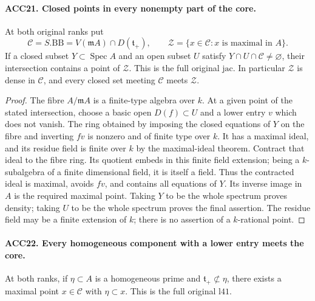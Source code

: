 \documentclass[11pt,a4paper]{article}
\numberwithin{equation}{section}
\theoremstyle{remark}\newtheorem{remark}[theorem]{Remark}
\begin{document}
\paragraph{ACC21. Closed points in every nonempty part of the core.}
\label{claim:ACC21}
At both original ranks put
\[
 \mathcal C=S.\mathrm{BB}
   =V(\mathfrak m A)\cap D(\mathfrak t_+),\qquad
 \mathcal Z=\{x\in\mathcal C:x\text{ is maximal in }A\}.
                                                               \tag{ACC.28}
\]
If a closed subset \(Y\subset\operatorname{Spec}A\) and an
open subset \(U\) satisfy \(Y\cap U\cap\mathcal C\ne\varnothing\),
their intersection contains a point of \(\mathcal Z\).
This is the full original \(\mathrm{jac}\).  In particular
\(\mathcal Z\) is dense in \(\mathcal C\), and every closed
set meeting \(\mathcal C\) meets \(\mathcal Z\).

\begin{proof}
The fibre \(A/\mathfrak m A\) is a finite-type algebra over
\(k\).  At a given point of the stated intersection, choose a
basic open \(D(f)\subset U\) and a lower entry \(v\) which
does not vanish.  The ring obtained by imposing the closed equations
of \(Y\) on the fibre and inverting \(fv\) is nonzero and
of finite type over \(k\).  It has a maximal ideal, and its
residue field is finite over \(k\) by the maximal-ideal theorem.
Contract that ideal to the fibre ring.  Its quotient embeds in this
finite field extension; being a \(k\)-subalgebra of a finite
dimensional field, it is itself a field.  Thus the contracted ideal
is maximal, avoids \(fv\), and contains all equations of \(Y\).
Its inverse image in \(A\) is the required maximal point.
Taking \(Y\) to be the whole spectrum proves density; taking
\(U\) to be the whole spectrum proves the final assertion.
The residue field may be a finite extension of \(k\); there is
no assertion of a \(k\)-rational point.
\end{proof}

\paragraph{ACC22. Every homogeneous component with a lower entry meets the core.}
\label{claim:ACC22}
At both ranks, if \(\eta\subset A\) is a homogeneous prime
and \(\mathfrak t_+\not\subset\eta\), there exists a maximal
point \(x\in\mathcal C\) with \(\eta\subset x\).
This is the full original \(\mathrm{l41}\).
\end{document}
